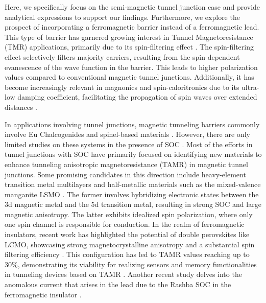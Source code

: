 \documentclass[10pt,pr,twocolumn,showpacs,amssymb,floatfix,superscriptaddress]{revtex4-1}
\begin{document}
Here, we specifically focus on the semi-magnetic tunnel junction case and provide analytical expressions to support our findings. Furthermore, we explore the prospect of incorporating a ferromagnetic barrier instead of a ferromagnetic lead. This type of barrier has garnered growing interest in Tunnel Magnetoresistance (TMR) applications, primarily due to its spin-filtering effect \cite{sf}. The spin-filtering effect selectively filters majority carriers, resulting from the spin-dependent evanescence of the wave function in the barrier. This leads to higher polarization values compared to conventional magnetic tunnel junctions. Additionally, it has become increasingly relevant in magnonics and spin-caloritronics due to its ultra-low damping coefficient, facilitating the propagation of spin waves over extended distances \cite{magnon}.




In applications involving tunnel junctions, magnetic tunneling barriers commonly involve Eu Chalcogenides \cite{Eu} and spinel-based materials \cite{spinel}. However, there are only limited studies on these systems in the presence of SOC \cite{EuMR}. Most of the efforts in tunnel junctions with SOC have primarily focused on identifying new materials to enhance tunneling anisotropic magnetoresistance (TAMR) in magnetic tunnel junctions. Some promising candidates in this direction include heavy-element transition metal multilayers \cite{CoPt} and half-metallic materials such as the mixed-valence manganite LSMO \cite{half}. The former involves hybridizing electronic states between the 3d magnetic metal and the 5d transition metal, resulting in strong SOC and large magnetic anisotropy. The latter exhibits idealized spin polarization, where only one spin channel is responsible for conduction. In the realm of ferromagnetic insulators, recent work has highlighted the potential of double perovskites like LCMO, showcasing strong magnetocrystalline anisotropy and a substantial spin filtering efficiency \cite{Zalto2023}. This configuration has led to TAMR values reaching up to 30\%, demonstrating its viability for realizing sensors and memory functionalities in tunneling devices based on TAMR \cite{tamr1}. Another recent study delves into the anomalous current that arises in the lead due to the Rashba SOC in the ferromagnetic insulator \cite{ahe1}.
\end{document}
